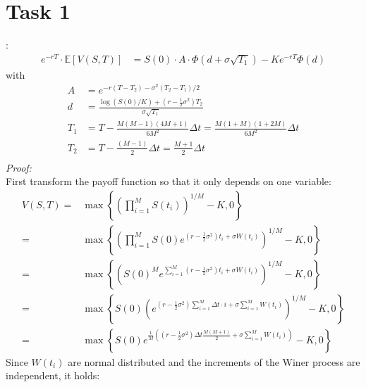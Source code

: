 \documentclass[a4paper,10pt]{article}
\title{}
\author{}
\begin{document}
\section*{Task 1}

:
\begin{align*}
  e^{-r T}\cdot \mathbb{E}\left[ V\left(S,T\right)\right] &=S(0)\cdot A \cdot \Phi\left(d+\sigma \sqrt{T_1}\right)-K e^{-r T} \Phi(d)
\end{align*}
with
\begin{align*}
  A &=e^{-r\left(T-T_2\right)-\sigma^2\left(T_2-T_1\right)/2}\\
  d &=\frac{\log\left(S(0)/K\right)+\left(r-\frac{1}{2}\sigma^2\right)T_2}{\sigma \sqrt{T_1}}\\
  T_1&=T-\frac{M\left(M-1\right)\left(4M+1\right)}{6M^2}\Delta t = \frac{M (1+M) (1+2 M)}{6 M^2}\Delta t\\
  T_2&=T-\frac{\left(M-1\right)}{2}\Delta t=\frac{M+1}{2}\Delta t\\
\end{align*}
{\textit{Proof:}}\\
First transform the payoff function so that it only depends on one variable:
\begin{align*}
 V\left(S,T\right)=& \max \left\{\left(\prod_{i=1}^M S\left(t_i\right)\right)^{1/M}-K,0\right\}\\
  =& \max \left\{\left(\prod_{i=1}^M  S\left(0\right) e^{\left(r-\frac{1}{2}\sigma^2\right)t_i+\sigma W\left(t_i\right)}  \right)^{1/M}-K,0\right\}\\
  =& \max \left\{\left(S\left(0\right)^M e^{\sum_{i=1}^M\left(r-\frac{1}{2}\sigma^2\right)t_i+\sigma W\left(t_i\right)}  \right)^{1/M}-K,0\right\}\\
  =& \max \left\{S\left(0\right)\left( e^{\left(r-\frac{1}{2}\sigma^2\right)\sum_{i=1}^M \Delta t \cdot i+\sigma \sum_{i=1}^M W\left(t_i\right)}  \right)^{1/M}-K,0\right\}\\
  =& \max \left\{S\left(0\right) e^{\frac{1}{M}\left(\left(r-\frac{1}{2}\sigma^2\right) \Delta t \frac{M\left(M+1\right)}{2}+\sigma \sum_{i=1}^M W\left(t_i\right)\right)} -K,0\right\}
\end{align*}
Since $W(t_i)$ are normal distributed and the increments of the Winer process are independent, it holds:
\end{document}
